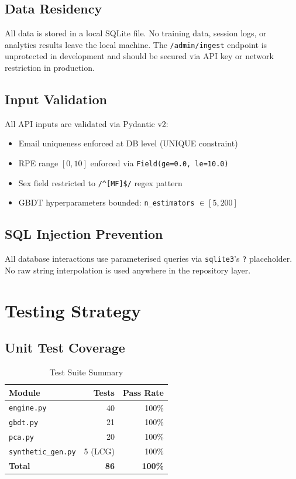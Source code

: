\documentclass[12pt,a4paper]{report}
\begin{document}
\section{Data Residency}

All data is stored in a local SQLite file. No training data, session logs, or
analytics results leave the local machine. The \texttt{/admin/ingest} endpoint
is unprotected in development and should be secured via API key or network
restriction in production.

\section{Input Validation}

All API inputs are validated via Pydantic v2:
\begin{itemize}
  \item Email uniqueness enforced at DB level (UNIQUE constraint)
  \item RPE range $[0, 10]$ enforced via \texttt{Field(ge=0.0, le=10.0)}
  \item Sex field restricted to \texttt{/\^{}[MF]\$/} regex pattern
  \item GBDT hyperparameters bounded: \texttt{n\_estimators} $\in [5, 200]$
\end{itemize}

\section{SQL Injection Prevention}

All database interactions use parameterised queries via \texttt{sqlite3}'s
\texttt{?} placeholder. No raw string interpolation is used anywhere in the
repository layer.

\chapter{Testing Strategy}

\section{Unit Test Coverage}

\begin{table}[h!]
\centering
\caption{Test Suite Summary}
\begin{tabular}{lrr}
\toprule
\textbf{Module} & \textbf{Tests} & \textbf{Pass Rate} \\
\midrule
\texttt{engine.py}       & 40 & 100\% \\
\texttt{gbdt.py}         & 21 & 100\% \\
\texttt{pca.py}          & 20 & 100\% \\
\texttt{synthetic\_gen.py} & 5 (LCG) & 100\% \\
\midrule
\textbf{Total}           & \textbf{86} & \textbf{100\%} \\
\bottomrule
\end{tabular}
\end{table}
\end{document}
